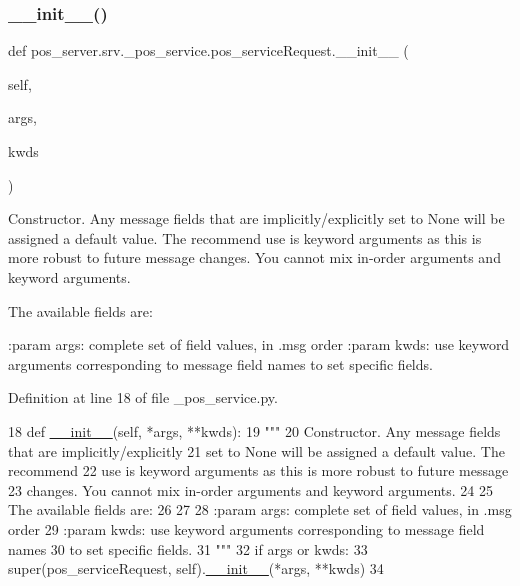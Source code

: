 \subsubsection{\texorpdfstring{\+\_\+\+\_\+init\+\_\+\+\_\+()}{\_\_init\_\_()}}
{\footnotesize\ttfamily def pos\+\_\+server.\+srv.\+\_\+pos\+\_\+service.\+pos\+\_\+service\+Request.\+\_\+\+\_\+init\+\_\+\+\_\+ (\begin{DoxyParamCaption}\item[{}]{self,  }\item[{}]{args,  }\item[{}]{kwds }\end{DoxyParamCaption})}

\begin{DoxyVerb}Constructor. Any message fields that are implicitly/explicitly
set to None will be assigned a default value. The recommend
use is keyword arguments as this is more robust to future message
changes.  You cannot mix in-order arguments and keyword arguments.

The available fields are:
   

:param args: complete set of field values, in .msg order
:param kwds: use keyword arguments corresponding to message field names
to set specific fields.
\end{DoxyVerb}
 

Definition at line 18 of file \+\_\+pos\+\_\+service.\+py.


\begin{DoxyCode}
18   \textcolor{keyword}{def }\hyperlink{classstate__machine_1_1Play_a5993a23d8be7f7b2647f71ede0334957}{\_\_init\_\_}(self, *args, **kwds):
19     \textcolor{stringliteral}{"""}
20 \textcolor{stringliteral}{    Constructor. Any message fields that are implicitly/explicitly}
21 \textcolor{stringliteral}{    set to None will be assigned a default value. The recommend}
22 \textcolor{stringliteral}{    use is keyword arguments as this is more robust to future message}
23 \textcolor{stringliteral}{    changes.  You cannot mix in-order arguments and keyword arguments.}
24 \textcolor{stringliteral}{}
25 \textcolor{stringliteral}{    The available fields are:}
26 \textcolor{stringliteral}{       }
27 \textcolor{stringliteral}{}
28 \textcolor{stringliteral}{    :param args: complete set of field values, in .msg order}
29 \textcolor{stringliteral}{    :param kwds: use keyword arguments corresponding to message field names}
30 \textcolor{stringliteral}{    to set specific fields.}
31 \textcolor{stringliteral}{    """}
32     \textcolor{keywordflow}{if} args \textcolor{keywordflow}{or} kwds:
33       super(pos\_serviceRequest, self).\hyperlink{classstate__machine_1_1Play_a5993a23d8be7f7b2647f71ede0334957}{\_\_init\_\_}(*args, **kwds)
34 
\end{DoxyCode}


